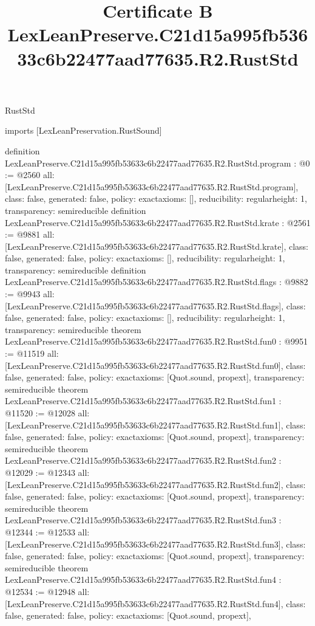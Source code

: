 \begin{lexlean}{RustStd}
\title{Certificate B LexLeanPreserve.C21d15a995fb53633c6b22477aad77635.R2.RustStd}
\begin{coremodule}
imports [LexLeanPreservation.RustSound]

definition LexLeanPreserve.C21d15a995fb53633c6b22477aad77635.R2.RustStd.program : @0 := @2560 {
  all: [LexLeanPreserve.C21d15a995fb53633c6b22477aad77635.R2.RustStd.program],
  class: false,
  generated: false,
  policy: exact{axioms: []},
  reducibility: regular{height: 1},
  transparency: semireducible
}
definition LexLeanPreserve.C21d15a995fb53633c6b22477aad77635.R2.RustStd.krate : @2561 := @9881 {
  all: [LexLeanPreserve.C21d15a995fb53633c6b22477aad77635.R2.RustStd.krate],
  class: false,
  generated: false,
  policy: exact{axioms: []},
  reducibility: regular{height: 1},
  transparency: semireducible
}
definition LexLeanPreserve.C21d15a995fb53633c6b22477aad77635.R2.RustStd.flags : @9882 := @9943 {
  all: [LexLeanPreserve.C21d15a995fb53633c6b22477aad77635.R2.RustStd.flags],
  class: false,
  generated: false,
  policy: exact{axioms: []},
  reducibility: regular{height: 1},
  transparency: semireducible
}
theorem LexLeanPreserve.C21d15a995fb53633c6b22477aad77635.R2.RustStd.fun0 : @9951 := @11519 {
  all: [LexLeanPreserve.C21d15a995fb53633c6b22477aad77635.R2.RustStd.fun0],
  class: false,
  generated: false,
  policy: exact{axioms: [Quot.sound, propext]},
  transparency: semireducible
}
theorem LexLeanPreserve.C21d15a995fb53633c6b22477aad77635.R2.RustStd.fun1 : @11520 := @12028 {
  all: [LexLeanPreserve.C21d15a995fb53633c6b22477aad77635.R2.RustStd.fun1],
  class: false,
  generated: false,
  policy: exact{axioms: [Quot.sound, propext]},
  transparency: semireducible
}
theorem LexLeanPreserve.C21d15a995fb53633c6b22477aad77635.R2.RustStd.fun2 : @12029 := @12343 {
  all: [LexLeanPreserve.C21d15a995fb53633c6b22477aad77635.R2.RustStd.fun2],
  class: false,
  generated: false,
  policy: exact{axioms: [Quot.sound, propext]},
  transparency: semireducible
}
theorem LexLeanPreserve.C21d15a995fb53633c6b22477aad77635.R2.RustStd.fun3 : @12344 := @12533 {
  all: [LexLeanPreserve.C21d15a995fb53633c6b22477aad77635.R2.RustStd.fun3],
  class: false,
  generated: false,
  policy: exact{axioms: [Quot.sound, propext]},
  transparency: semireducible
}
theorem LexLeanPreserve.C21d15a995fb53633c6b22477aad77635.R2.RustStd.fun4 : @12534 := @12948 {
  all: [LexLeanPreserve.C21d15a995fb53633c6b22477aad77635.R2.RustStd.fun4],
  class: false,
  generated: false,
  policy: exact{axioms: [Quot.sound, propext]},
}
\end{coremodule}
\end{lexlean}
